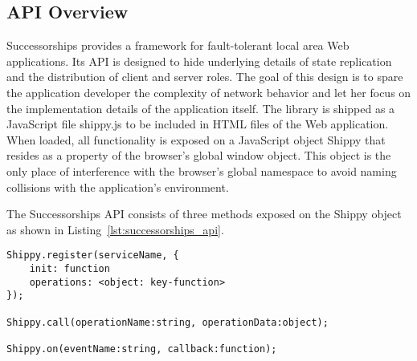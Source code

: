 \subsection{API Overview}
\label{sub:approach_api_overview}

Successorships provides a framework for fault-tolerant local area Web applications.
Its API is designed to hide underlying details of state replication and the distribution of client and server roles.
The goal of this design is to spare the application developer the complexity of network behavior and let her focus on the implementation details of the application itself.
The library is shipped as a JavaScript file {\ttfamily shippy.js} to be included in HTML files of the Web application.
When loaded, all functionality is exposed on a JavaScript object {\ttfamily Shippy} that resides as a property of the browser's global {\ttfamily window} object.
This object is the only place of interference with the browser's global namespace to avoid naming collisions with the application's environment.

The Successorships API consists of three methods exposed on the {\ttfamily Shippy} object as shown in Listing~\ref{lst:successorships_api}.

\begin{lstlisting}[caption={Successorships API},label={lst:successorships_api}]
Shippy.register(serviceName, {
    init: function
    operations: <object: key-function>
});

Shippy.call(operationName:string, operationData:object);

Shippy.on(eventName:string, callback:function);
\end{lstlisting}